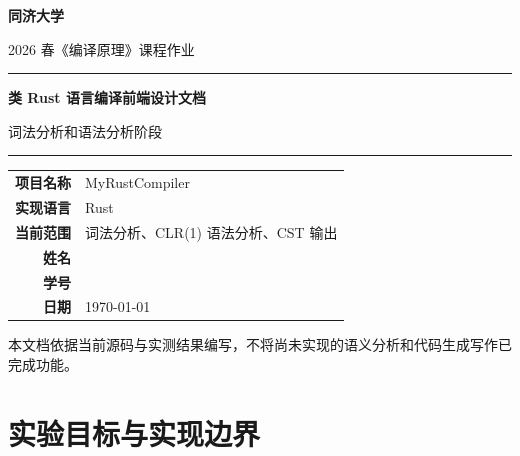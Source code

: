 \documentclass[UTF8,a4paper,12pt,fontset=none]{ctexart}
\newcommand{\ReportTitle}{类 Rust 语言编译前端设计文档}
\newcommand{\ReportCourse}{编译原理}
\newcommand{\ReportProject}{MyRustCompiler}
\newcommand{\ReportTerm}{2026 春}
\begin{document}
\hypersetup{pageanchor=false}
\begin{titlepage}
\thispagestyle{empty}
\centering
\vspace*{1.2cm}
{\bfseries 同济大学\par}
\vspace{0.6cm}
{\Large \ReportTerm《\ReportCourse》课程作业\par}
\vspace{2.0cm}
{\color{reportblue}\rule{0.78\textwidth}{1.2pt}\par}
\vspace{0.65cm}
{\bfseries \ReportTitle\par}
\vspace{0.45cm}
{\large 词法分析和语法分析阶段 \par}
\vspace{0.65cm}
{\color{reportblue}\rule{0.78\textwidth}{1.2pt}\par}
\vfill
\begin{tabular}{>{\bfseries}r@{\quad}l}
项目名称 & \ReportProject \\
实现语言 & Rust \\
当前范围 & 词法分析、CLR(1) 语法分析、CST 输出 \\
姓名 & \underline{\hspace{7cm}} \\
学号 & \underline{\hspace{7cm}} \\
日期 & \today \\
\end{tabular}
\vfill
{\small 本文档依据当前源码与实测结果编写，不将尚未实现的语义分析和代码生成写作已完成功能。\par}
\end{titlepage}

\setcounter{page}{1}

\begin{abstract}
本文档描述当前项目中已经实现并经过验证的编译前端部分。项目使用 Rust 编写，围绕一个简单类 Rust 语言完成源文件读取、词法分析、文法建模、CLR(1) 项目集族构造、ACTION/GOTO 分析表构建、表驱动语法分析以及 CST（Concrete Syntax Tree，具体语法树）输出。本文不把尚未形成源码实现的语义分析、类型检查、符号表管理和代码生成写作已完成功能，而是在不足与后续工作中如实说明。
\end{abstract}

\tableofcontents
\clearpage
{}
\setcounter{page}{1}
\hypersetup{pageanchor=true}

\section{实验目标与实现边界}
\end{document}
